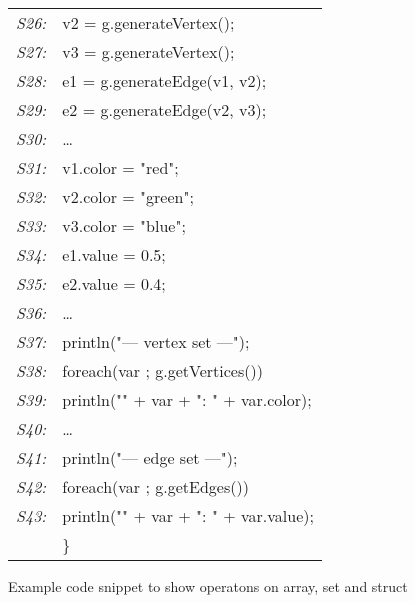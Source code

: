 \begin{figure}
\begin{center}
{\begin{tabular}[b]{rl}
	  {\em \scriptsize S26:}&  \quad  v2 = g.generateVertex();\\
	  {\em \scriptsize S27:}&  \quad  v3 = g.generateVertex();\\
	  {\em \scriptsize S28:}&  \quad  e1 = g.generateEdge(v1, v2);\\
	  {\em \scriptsize S29:}&  \quad  e2 = g.generateEdge(v2, v3);\\
	  {\em \scriptsize S30:}&  \quad  \ldots\\
	  {\em \scriptsize S31:}&  \quad  v1.color = "red";\\
	  {\em \scriptsize S32:}&  \quad  v2.color = "green";\\
	  {\em \scriptsize S33:}&  \quad  v3.color = "blue";\\
	  {\em \scriptsize S34:}&  \quad  e1.value = 0.5;\\
	  {\em \scriptsize S35:}&  \quad  e2.value = 0.4;\\
	  {\em \scriptsize S36:}&  \quad  \ldots\\
	  {\em \scriptsize S37:}&  \quad  println("--- vertex set ---");\\
	  {\em \scriptsize S38:}&  \quad  foreach(var ; g.getVertices())\\
	  {\em \scriptsize S39:}&  \quad  \quad	println("" + var + ": " + var.color);\\
	  {\em \scriptsize S40:}&  \quad  \ldots\\
	  {\em \scriptsize S41:}&  \quad  println("--- edge set ---");\\
	  {\em \scriptsize S42:}&  \quad  foreach(var ; g.getEdges())\\
	  {\em \scriptsize S43:}&  \quad  \quad	println("" + var + ": " + var.value);\\
          &\}
        \end{tabular}
      }
\end{center}
  \caption{Example code snippet to show operatons on array, set and struct}
  \label{fig:language_1}
\end{figure}
